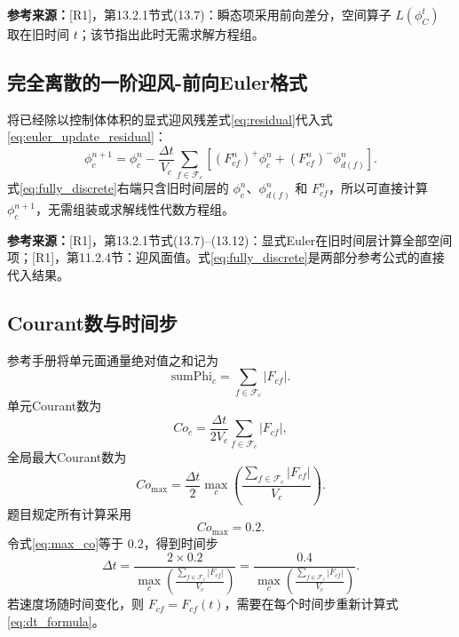 \documentclass[UTF8,12pt,a4paper]{ctexart}
\numberwithin{equation}{section}
\newcommand{\Rone}{\textnormal{[R1]}}
\newcommand{\source}[1]{%
  \par\smallskip
  \noindent\colorbox{sourcebg}{%
    \parbox{0.955\linewidth}{\footnotesize\color{sourcegray}\textbf{参考来源：}#1}%
  }
  \par\smallskip
}
\begin{document}
\source{\Rone，第13.2.1节式(13.7)：瞬态项采用前向差分，空间算子 $L(\phi_C^t)$ 取在旧时间 $t$；该节指出此时无需求解方程组。}

\subsection{完全离散的一阶迎风-前向Euler格式}

将已经除以控制体体积的显式迎风残差式\eqref{eq:residual}代入式\eqref{eq:euler_update_residual}：
\begin{equation}
  \boxed{
  \phi_c^{n+1}
  =\phi_c^n
  -\frac{\Delta t}{V_c}
  \sum_{f\in\mathcal F_c}
  \left[
    (F_{cf}^n)^+\phi_c^n
    +(F_{cf}^n)^-\phi_{d(f)}^n
  \right]
  }.
  \label{eq:fully_discrete}
\end{equation}
式\eqref{eq:fully_discrete}右端只含旧时间层的 $\phi_c^n$、$\phi_{d(f)}^n$ 和 $F_{cf}^n$，所以可直接计算 $\phi_c^{n+1}$，无需组装或求解线性代数方程组。

\source{\Rone，第13.2.1节式(13.7)--(13.12)：显式Euler在旧时间层计算全部空间项；\Rone，第11.2.4节：迎风面值。式\eqref{eq:fully_discrete}是两部分参考公式的直接代入结果。}

\subsection{Courant数与时间步}

参考手册将单元面通量绝对值之和记为
\begin{equation}
  \mathrm{sumPhi}_c
  =\sum_{f\in\mathcal F_c}|F_{cf}|.
  \label{eq:sumphi}
\end{equation}
单元Courant数为
\begin{equation}
  Co_c
  =\frac{\Delta t}{2V_c}
  \sum_{f\in\mathcal F_c}|F_{cf}|,
  \label{eq:local_co}
\end{equation}
全局最大Courant数为
\begin{equation}
  Co_{\max}
  =\frac{\Delta t}{2}
  \max_c\left(
    \frac{\sum_{f\in\mathcal F_c}|F_{cf}|}{V_c}
  \right).
  \label{eq:max_co}
\end{equation}
题目规定所有计算采用
\begin{equation}
  Co_{\max}=0.2.
  \label{eq:co_task}
\end{equation}
令式\eqref{eq:max_co}等于 $0.2$，得到时间步
\begin{equation}
  \boxed{
  \Delta t
  =\frac{2\times0.2}{
    \displaystyle
    \max_c\left(
      \frac{\sum_{f\in\mathcal F_c}|F_{cf}|}{V_c}
    \right)}
  =\frac{0.4}{
    \displaystyle
    \max_c\left(
      \frac{\sum_{f\in\mathcal F_c}|F_{cf}|}{V_c}
    \right)}
  }.
  \label{eq:dt_formula}
\end{equation}
若速度场随时间变化，则 $F_{cf}=F_{cf}(t)$，需要在每个时间步重新计算式\eqref{eq:dt_formula}。
\end{document}

